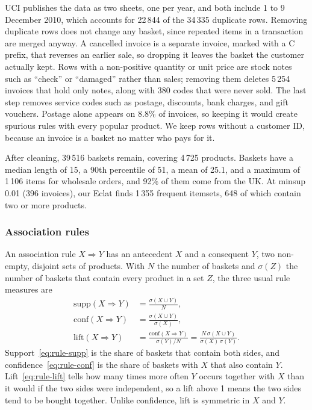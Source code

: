 UCI publishes the data as two sheets, one per year, and both include 1 to 9 December
2010, which accounts for 22\,844 of the 34\,335 duplicate rows. Removing duplicate rows
does not change any basket, since repeated items in a transaction are merged anyway. A
cancelled invoice is a separate invoice, marked with a C prefix, that reverses an earlier
sale, so dropping it leaves the basket the customer actually kept. Rows with a
non-positive quantity or unit price are stock notes such as ``check'' or ``damaged''
rather than sales; removing them deletes 5\,254 invoices that hold only notes, along with
380 codes that were never sold. The last step removes service codes such as postage,
discounts, bank charges, and gift vouchers. Postage alone appears on 8.8\% of invoices,
so keeping it would create spurious rules with every popular product. We keep rows
without a customer ID, because an invoice is a basket no matter who pays for it.

After cleaning, 39\,516 baskets remain, covering 4\,725 products. Baskets have a median
length of 15, a 90th percentile of 51, a mean of 25.1, and a maximum of 1\,106 items for
wholesale orders, and 92\% of them come from the UK. At minsup 0.01 (396 invoices), our
Eclat finds 1\,355 frequent itemsets, 648 of which contain two or more products.

\subsubsection{Association rules}
An association rule $X \Rightarrow Y$ has an antecedent $X$ and a consequent $Y$, two
non-empty, disjoint sets of products. With $N$ the number of baskets and $\sigma(Z)$ the
number of baskets that contain every product in a set $Z$, the three usual rule measures
are
\begin{align}
\mathrm{supp}(X \Rightarrow Y) &= \frac{\sigma(X \cup Y)}{N}, \label{eq:rule-supp}\\
\mathrm{conf}(X \Rightarrow Y) &= \frac{\sigma(X \cup Y)}{\sigma(X)}, \label{eq:rule-conf}\\
\mathrm{lift}(X \Rightarrow Y) &= \frac{\mathrm{conf}(X \Rightarrow Y)}{\sigma(Y)/N}
  = \frac{N\,\sigma(X \cup Y)}{\sigma(X)\,\sigma(Y)}. \label{eq:rule-lift}
\end{align}
Support~\eqref{eq:rule-supp} is the share of baskets that contain both sides, and
confidence~\eqref{eq:rule-conf} is the share of baskets with $X$ that also contain $Y$.
Lift~\eqref{eq:rule-lift} tells how many times more often $Y$ occurs together with $X$
than it would if the two sides were independent, so a lift above 1 means the two sides
tend to be bought together. Unlike confidence, lift is symmetric in $X$ and $Y$.

